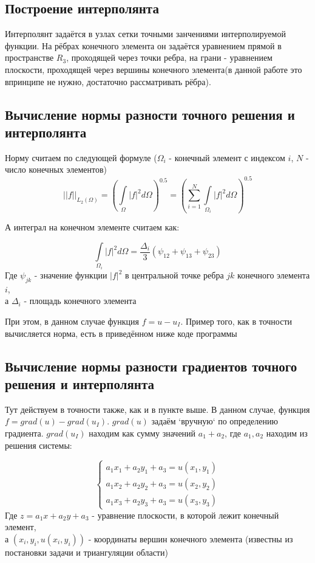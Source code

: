 \documentclass[12pt]{article}
\begin{document}
\subsection{Построение интерполянта}
Интерполянт задаётся в узлах сетки точными занчениями интерполируемой функции. На рёбрах конечного элемента он задаётся уравнением прямой в пространстве $R_3$, проходящей через точки ребра, на грани - уравнением плоскости, проходящей через вершины конечного элемента(в данной работе это впринципе не нужно, достаточно рассматривать рёбра).

\subsection{Вычисление нормы разности точного решения и интерполянта}

Норму считаем по следующей формуле
($\Omega_i$ - конечный элемент с индексом $i$, $N$ - число конечных элементов)
$$
||f||_{L_2(\Omega)} = \left(\int\limits_{\Omega}|f|^2d\Omega\right)^{0.5} = \left(\sum_{i=1}^{N}\int\limits_{\Omega_i}|f|^2d\Omega\right)^{0.5}
$$

А интеграл на конечном элементе считаем как:

$$
\int\limits_{\Omega_i}|f|^2d\Omega = \dfrac{\Delta_i}{3}(\psi_{12} + \psi_{13} + \psi_{23})
$$
Где $\psi_{jk}$ - значение функции $|f|^2$ в центральной точке ребра $jk$ конечного элемента $i$, \\
а $\Delta_i$ - площадь конечного элемента

При этом, в данном случае функция $f = u - u_I$. Пример того, как в точности вычисляется норма, есть в приведённом ниже коде программы

\subsection{Вычисление нормы разности градиентов точного решения и интерполянта}

Тут действуем в точности также, как и в пункте выше. В данном случае, функция $f = grad(u) - grad(u_I)$. $grad(u)$ задаём `вручную` по определению градиента. $grad(u_I)$ находим как сумму значений $a_1 + a_2$, где $a_1, a_2$ находим из решения системы:

\begin{equation}
 \begin{cases}
  a_1x_1 + a_2y_1 + a_3 = u(x_1, y_1) \\
  a_1x_2 + a_2y_2 + a_3 = u(x_2, y_2) \\
  a_1x_3 + a_2y_3 + a_3 = u(x_3, y_3)
 \end{cases}
 \nonumber
\end{equation}
Где $z = a_1x + a_2y + a_3$ - уравнение плоскости, в которой лежит конечный элемент, \\
а $(x_i, y_i, u(x_i, y_i))$ - координаты вершин конечного элемента (известны из постановки задачи и триангуляции области)
\end{document}
